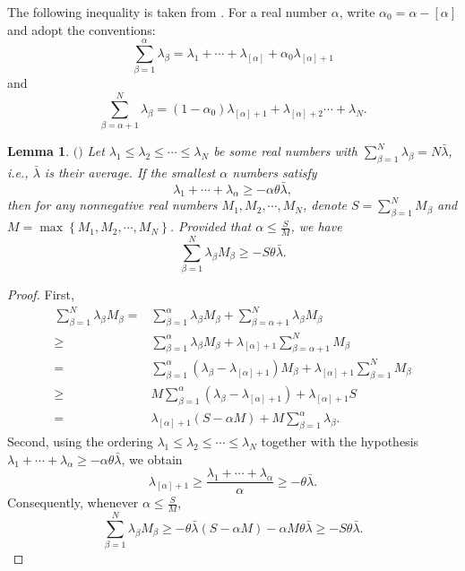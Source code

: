 \documentclass{amsart}
\newtheorem{lemma}[theorem]{Lemma}
\theoremstyle{definition}
\theoremstyle{remark}
\numberwithin{equation}{section}
\begin{document}
The following inequality is taken from \cite{fu2025new}. For a real number $\alpha $, write ${\alpha _0} = \alpha  - \left[ \alpha  \right]$ and adopt the conventions:
$$\sum\limits_{\beta = 1}^{\alpha}  {{\lambda _\beta }}  = {\lambda _1} +  \cdots  + {\lambda _{\left[ \alpha  \right]}} + {\alpha _0}{\lambda _{\left[ \alpha  \right] + 1}}$$
and
$$\sum\limits_{\beta  = \alpha  + 1}^N {{\lambda _\beta } = \left( {1 - {\alpha _0}} \right)} {\lambda _{\left[ \alpha  \right] + 1}} + {\lambda _{\left[ \alpha  \right] + 2}} \cdots  + {\lambda _N}.$$
\begin{lemma} $(${\cite{fu2025new}}$)$
\label{lemma2.5}
Let ${\lambda _1} \le {\lambda _2} \le  \cdots  \le {\lambda _N}$ be some real numbers with $\sum\limits_{\beta  = 1}^N {{\lambda _\beta }}  = N\bar \lambda $, i.e., $\bar \lambda $ is their average. If the smallest $\alpha$  numbers satisfy
$${\lambda _1} +  \cdots  + {\lambda _\alpha } \ge  - \alpha \theta \bar \lambda ,$$
then for any nonnegative real numbers ${M_1},{M_2}, \cdots ,{M_N}$, denote $S = \sum\limits_{\beta  = 1}^N {{M_\beta }} $ and $M = \max \left\{ {{M_1},{M_2}, \cdots ,{M_N}} \right\}$. Provided that $\alpha  \le \frac{S}{M}$, we have
$$\sum\limits_{\beta = 1}^N {{\lambda _\beta }{M_\beta}}  \ge  - S\theta \bar \lambda .$$
\end{lemma}
\begin{proof}
First,
\begin{align*}
\sum\limits_{\beta  = 1}^N {{\lambda _\beta}{M_\beta }}  =& \sum\limits_{\beta = 1}^{\alpha} {{\lambda _\beta }{M_\beta}}  + \sum\limits_{\beta  = \alpha + 1}^N {{\lambda _\beta }{M_\beta }} \\
 \ge & \sum\limits_{\beta = 1}^{\alpha}{{\lambda _\beta }{M_\beta}}  + {\lambda _{\left[ \alpha \right] + 1}}\sum\limits_{\beta  = \alpha + 1}^N {{M_\beta }} \\
 = & \sum\limits_{\beta  = 1}^{\alpha} {\left( {{\lambda _\beta } - {\lambda _{\left[ \alpha \right] + 1}}} \right){M_\beta }}  + {\lambda _{\left[ \alpha \right] + 1}}\sum\limits_{\beta  = 1}^N {{M_\beta }} \\
 \ge & M\sum\limits_{\beta  = 1}^{\alpha} {\left( {{\lambda _\beta } - {\lambda _{\left[ \alpha \right] + 1}}} \right)}  + {\lambda _{\left[ \alpha \right] + 1}}S\\
= & {\lambda _{\left[ \alpha\right] + 1}}\left( {S - \alpha M} \right) + M\sum\limits_{\beta  =   1}^{\alpha} {{\lambda _\beta }} .
\end{align*}
Second, using the ordering ${\lambda _1} \le {\lambda _2} \le  \cdots  \le {\lambda _N}$ together with the hypothesis ${\lambda _1} +  \cdots  + {\lambda _\alpha} \ge  - \alpha\theta \bar \lambda$, we obtain
\begin{equation}
\label{equation2.3}
{\lambda _{\left[ \alpha \right] + 1}} \ge \frac{{{\lambda _1} +  \cdots  + {\lambda _\alpha}}}{\alpha} \ge  - \theta \bar \lambda .
\end{equation}
Consequently, whenever $\alpha \le \frac{S}{M}$,
$$\sum\limits_{\beta  = 1}^N {{\lambda _\beta }{M_\beta }}  \ge  - \theta \bar \lambda \left( {S - \alpha M} \right) - \alpha M\theta \bar \lambda  \ge  - S\theta \bar \lambda. $$
\end{proof}
\end{document}
